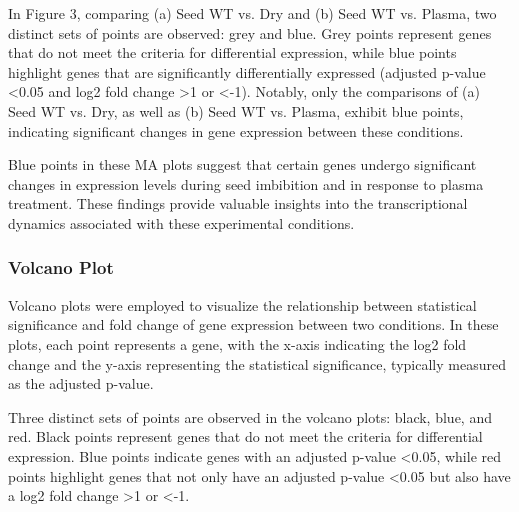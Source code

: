 \documentclass[12pt,letterpaper]{article}
\begin{document}
In Figure 3, comparing (a) Seed WT vs. Dry and (b) Seed WT vs. Plasma, two distinct sets of points are observed: grey and blue. Grey points represent genes that do not meet the criteria for differential expression, while blue points highlight genes that are significantly differentially expressed (adjusted p-value \textless0.05 and log2 fold change \textgreater 1 or \textless -1). Notably, only the comparisons of (a) Seed WT vs. Dry, as well as (b) Seed WT vs. Plasma, exhibit blue points, indicating significant changes in gene expression between these conditions.

Blue points in these MA plots suggest that certain genes undergo significant changes in expression levels during seed imbibition and in response to plasma treatment. These findings provide valuable insights into the transcriptional dynamics associated with these experimental conditions.

\subsubsection{Volcano Plot}
Volcano plots were employed to visualize the relationship between statistical significance and fold change of gene expression between two conditions. In these plots, each point represents a gene, with the x-axis indicating the log2 fold change and the y-axis representing the statistical significance, typically measured as the adjusted p-value.

Three distinct sets of points are observed in the volcano plots: black, blue, and red. Black points represent genes that do not meet the criteria for differential expression. Blue points indicate genes with an adjusted p-value \textless 0.05, while red points highlight genes that not only have an adjusted p-value \textless 0.05 but also have a log2 fold change \textgreater 1 or \textless -1.
\end{document}
